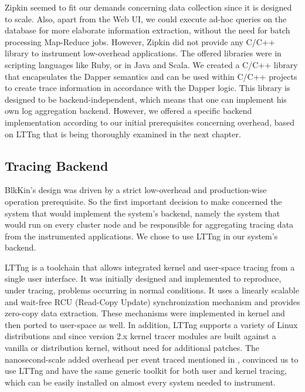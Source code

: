 \documentclass[11pt,journal,compsoc]{IEEEtran}
\begin{document}
Zipkin seemed to fit our demands concerning data collection since it is
designed to scale. Also, apart from the Web UI, we could execute ad-hoc queries
on the database for more elaborate information extraction, without the need for
batch processing Map-Reduce jobs. However, Zipkin did not provide any C/C++
library to instrument low-overhead applications. The offered libraries were in
scripting languages like Ruby, or in Java and Scala. We created a C/C++ library
that encapsulates the Dapper semantics and can be used within C/C++ projects to
create trace information in accordance with the Dapper logic.  This library is
designed to be backend-independent, which means that one can implement his own
log aggregation backend.  However, we offered a specific backend implementation
according to our initial prerequisites concerning overhead, based on LTTng that
is being thoroughly examined in the next chapter.

\subsection{Tracing Backend}

BlkKin's design was driven by a strict low-overhead and production-wise
operation prerequisite. So the first important decision to make concerned the
system that would implement the system's backend, namely the system that would
run on every cluster node and be responsible for aggregating tracing data from
the instrumented applications. We chose to use LTTng in our system's backend.

LTTng is a toolchain that allows integrated kernel and user-space tracing from
a single user interface. It was initially designed and implemented to
reproduce, under tracing, problems occurring in normal conditions. It uses a
linearly scalable and wait-free RCU (Read-Copy Update) synchronization
mechanism and provides zero-copy data extraction. These mechanisms were
implemented in kernel and then ported to user-space as well. In addition, LTTng
supports a variety of Linux distributions and since version 2.x kernel tracer
modules are built against a vanilla or distribution kernel, without need for
additional patches. The nanosecond-scale added overhead per event traced
mentioned in \cite{desnoyer}, convinced us to use LTTng and have the same
generic toolkit for both user and kernel tracing, which can be easily
installed on almost every system needed to instrument.
\end{document}
